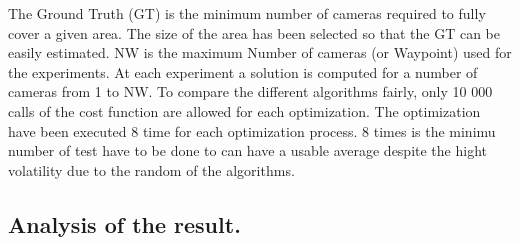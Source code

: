 The Ground Truth (GT) is the minimum number of cameras required to fully cover a given area. The size of the area has been selected so that the GT can be easily estimated. 
NW is the maximum Number of cameras (or Waypoint) used for the experiments.  
At each experiment a solution is computed for a number of cameras from 1  to NW. To compare the different algorithms fairly, only 10 000 calls of the cost function are allowed for each optimization.
The optimization have been executed 8 time for each optimization process. 8 times is the minimu number of test have to be done to can have a usable average despite the hight volatility due to the random of the algorithms.\\ %


\subsection{ Analysis of the result.}

